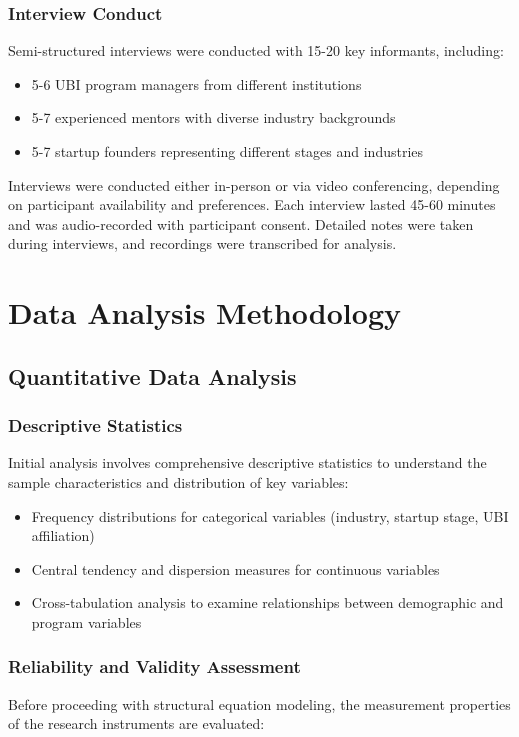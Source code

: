 \documentclass[../Main.tex]{subfiles}%
\begin{document}
	\subsubsection{Interview Conduct}
	Semi-structured interviews were conducted with 15-20 key informants, including:
	\begin{itemize}
		\item 5-6 UBI program managers from different institutions
		\item 5-7 experienced mentors with diverse industry backgrounds
		\item 5-7 startup founders representing different stages and industries
	\end{itemize}
	
	Interviews were conducted either in-person or via video conferencing, depending on participant availability and preferences. Each interview lasted 45-60 minutes and was audio-recorded with participant consent. Detailed notes were taken during interviews, and recordings were transcribed for analysis.
	
	\section{Data Analysis Methodology}
	
	\subsection{Quantitative Data Analysis}
	
	\subsubsection{Descriptive Statistics}
	Initial analysis involves comprehensive descriptive statistics to understand the sample characteristics and distribution of key variables:
	\begin{itemize}
		\item Frequency distributions for categorical variables (industry, startup stage, UBI affiliation)
		\item Central tendency and dispersion measures for continuous variables
		\item Cross-tabulation analysis to examine relationships between demographic and program variables
	\end{itemize}
	
	\subsubsection{Reliability and Validity Assessment}
	Before proceeding with structural equation modeling, the measurement properties of the research instruments are evaluated:
	
\end{document}
